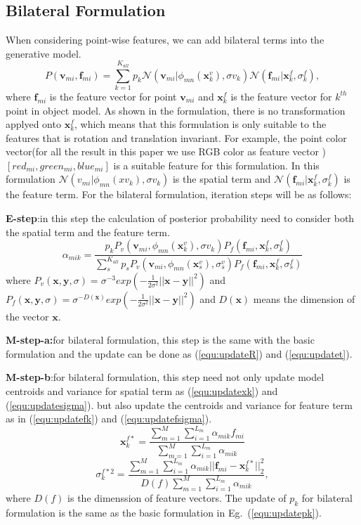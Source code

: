 \subsection{Bilateral Formulation}
When considering point-wise features, we can add bilateral terms into the generative model.
\begin{equation}
P(\pmb{v}_{mi},\pmb{f}_{mi})=\sum^{K_{all}}_{k=1}p_k\mathcal{N}(\pmb{v}_{mi}|\phi_{mn}(\pmb{x}^v_k),\sigma v_k)\mathcal{N}(\pmb{f}_{mi}|\pmb{x}^f_k,\sigma^f_k),
\end{equation}
where $\pmb{f}_{mi}$ is the feature vector for point $\pmb{v}_{mi}$ and $\pmb{x}_k^f$ is the feature vector for $k^{th}$ point in object model. As shown in the formulation, there is no transformation applyed onto $\pmb{x}_k^f$, which means that this formulation is only suitable to the features that is rotation and translation invariant. For example, the point color vector(for all the result in this paper we use RGB color as feature vector ) $[red_{mi},green_{mi},blue_{mi}]$ is a suitable feature for this formulation. In this formulation $\mathcal{N}(v_{mi}|\phi_{mn}(xv_k),\sigma v_k)$ is the spatial term and $\mathcal{N}(\pmb{f}_{mi}|\pmb{x}^f_k,\sigma^f_k)$ is the feature term.
For the bilateral formulation, iteration steps will be as follows:

\noindent\textbf{E-step}:in this step the calculation of posterior probability need to consider both the spatial term and the feature term.
\begin{equation}
\label{equ:bestep}
\alpha_{mik}=\frac{p_kP_v( \pmb{v}_{mi},\phi_{mn}(\pmb{x}^v_k),\sigma v_k)P_f(\pmb f_{mi},\pmb x^f_k,\sigma^f_k)}{\sum_s^{K_{all}}p_sP_v( \pmb v_{mi},\phi_{mn}(\pmb{x}^v_s),\sigma^v_s)P_f(\pmb f_{mi},\pmb{x}^f_k,\sigma^f_s)}
\end{equation}
where $P_v(\pmb{x},\pmb{y},\sigma)=\sigma^{-3}exp(-\frac{1}{2\sigma^2}||\pmb{x}-\pmb{y}||^2)$ and $P_f(\pmb{x},\pmb{y},\sigma)=\sigma^{-D(\pmb{x})}exp(-\frac{1}{2\sigma^2}||\pmb{x}-\pmb{y}||^2)$ and $D(\pmb{x})$ means the dimension of the vector $\pmb x$. 

\textbf{M-step-a:}for bilateral formulation, this step is the same with the basic formulation and the update can be done as (\ref{equ:updateR}) and (\ref{equ:updatet}).

\textbf{M-step-b}:for bilateral formulation, this step need not only update model centroids and variance for spatial term as (\ref{equ:updatexk}) and (\ref{equ:updatesigma}).
but also update the centroids and variance for feature term as in (\ref{equ:updatefk}) and (\ref{equ:updatefsigma}).
\begin{equation}
\label{equ:updatefk}
\pmb{x}_k^{f*}=\frac{\sum_{m=1}^M\sum_{i=1}^{L_m}\alpha_{mik}f_{mi}}{\sum_{m=1}^M\sum_{i=1}^{L_m}\alpha_{mik}}
\end{equation}
\begin{equation}
\label{equ:updatefsigma}
\sigma_k^{f*2}=\frac{\sum_{m=1}^M\sum_{i=1}^{L_m}\alpha_{mik}||\pmb f_{mi}-\pmb{x}_k^{f*}||_2^2}{D(f)\sum_{m=1}^M\sum_{i=1}^{L_m}\alpha_{mik}},
\end{equation}
where $D(f)$ is the dimenssion of feature vectors. The update of $p_k$ for bilateral formulation is the same as the basic formulation in Eg.~(\ref{equ:updatepk}).

